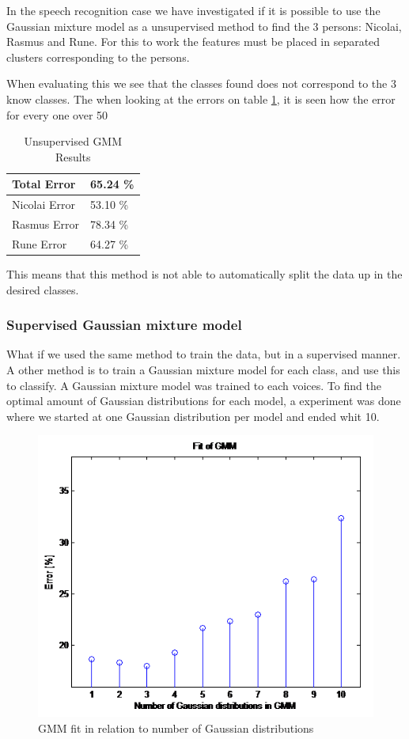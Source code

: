 In the speech recognition case we have investigated if it is possible to use the Gaussian mixture model as a unsupervised method to find the 3 persons: Nicolai, Rasmus and Rune. For this to work the features must be placed in separated clusters corresponding to the persons. 

When evaluating this we see that the classes found does not correspond to the 3 know classes. The when looking at the errors on table \ref{tab:resultTableUGMM}, it is seen how the error for every one over 50%


\begin{table}[H]
\centering
\begin{tabular}{ll}
\hline
Total Error   & 65.24 \% \\ \hline
Nicolai Error & 53.10 \% \\
Rasmus Error  & 78.34 \% \\
Rune Error    & 64.27 \% \\ \hline
\end{tabular}
\caption{Unsupervised GMM Results}
\label{tab:resultTableUGMM}
\end{table}
 
This means that this method is not able to automatically split the data up in the desired classes.
 
\subsubsection{Supervised Gaussian mixture model}
\label{sec:EMGMM}

What if we used the same method to train the data, but in a supervised manner. A other method is to train a Gaussian mixture model for each class, and use this to classify. A Gaussian mixture model was trained to each voices. To find the optimal amount of Gaussian distributions for each model, a experiment was done where we started at one Gaussian distribution per model and ended whit 10.

\begin{figure}[H]
\centering
\includegraphics[scale=0.7]{billeder/fitGmm}
\caption{GMM fit in relation to number of Gaussian distributions}
\label{fig:fitGMM}
\end{figure}

